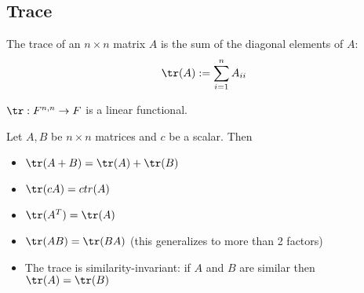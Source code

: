 \subsection{Trace}

\begin{definition}
  The trace of an $n \times n$ matrix $A$ is the sum of the diagonal elements of $A$:
  \[
    \tr(A) := \sum_{i = 1}^n A_{ii}
  \]

  $\tr : F^{n,n} \to F$ is a linear functional.
\end{definition}

\begin{theorem}
  Let $A, B$ be $n \times n$ matrices and $c$ be a scalar. Then
  \begin{itemize}
    \item $\tr(A + B) = \tr(A) + \tr(B)$
    \item $\tr(cA) = c tr(A)$
    \item $\tr(A^T) = \tr(A)$
    \item $\tr(AB) = \tr(BA)$ (this generalizes to more than 2 factors)
    \item The trace is similarity-invariant: if $A$ and $B$ are similar then $\tr(A) = \tr(B)$
  \end{itemize}
\end{theorem}




